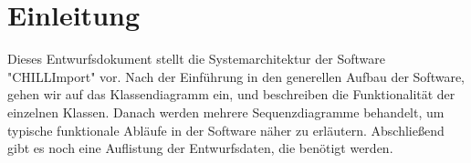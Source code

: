 \section{Einleitung}

Dieses Entwurfsdokument stellt die Systemarchitektur der Software \string"CHILLImport\string" vor.
Nach der Einführung in den generellen Aufbau der Software, gehen wir auf das Klassendiagramm ein, und beschreiben die Funktionalität der einzelnen Klassen.
Danach werden mehrere Sequenzdiagramme behandelt, um typische funktionale Abläufe in der Software näher zu erläutern.
Abschließend gibt es noch eine Auflistung der Entwurfsdaten, die benötigt werden.
